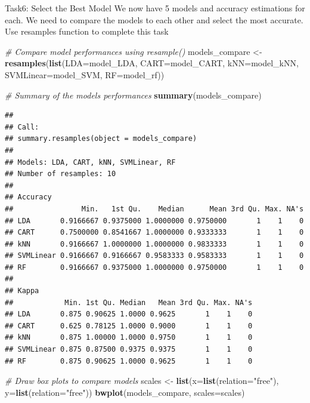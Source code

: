 \documentclass[
]{article}
\newenvironment{Shaded}{\begin{snugshade}}{\end{snugshade}}
\newcommand{\AttributeTok}[1]{\textcolor[rgb]{0.13,0.29,0.53}{#1}}
\newcommand{\CommentTok}[1]{\textcolor[rgb]{0.56,0.35,0.01}{\textit{#1}}}
\newcommand{\FunctionTok}[1]{\textcolor[rgb]{0.13,0.29,0.53}{\textbf{#1}}}
\newcommand{\NormalTok}[1]{#1}
\newcommand{\OtherTok}[1]{\textcolor[rgb]{0.56,0.35,0.01}{#1}}
\newcommand{\StringTok}[1]{\textcolor[rgb]{0.31,0.60,0.02}{#1}}
\begin{document}
Task6: Select the Best Model We now have 5 models and accuracy
estimations for each. We need to compare the models to each other and
select the most accurate. Use resamples function to complete this task

\begin{Shaded}
\begin{Highlighting}[]
\CommentTok{\# Compare model performances using resample()}
\NormalTok{models\_compare }\OtherTok{\textless{}{-}} \FunctionTok{resamples}\NormalTok{(}\FunctionTok{list}\NormalTok{(}\AttributeTok{LDA=}\NormalTok{model\_LDA, }\AttributeTok{CART=}\NormalTok{model\_CART, }\AttributeTok{kNN=}\NormalTok{model\_kNN, }\AttributeTok{SVMLinear=}\NormalTok{model\_SVM, }\AttributeTok{RF=}\NormalTok{model\_rf))}

\CommentTok{\# Summary of the models performances}
\FunctionTok{summary}\NormalTok{(models\_compare)}
\end{Highlighting}
\end{Shaded}

\begin{verbatim}
## 
## Call:
## summary.resamples(object = models_compare)
## 
## Models: LDA, CART, kNN, SVMLinear, RF 
## Number of resamples: 10 
## 
## Accuracy 
##                Min.   1st Qu.    Median      Mean 3rd Qu. Max. NA's
## LDA       0.9166667 0.9375000 1.0000000 0.9750000       1    1    0
## CART      0.7500000 0.8541667 1.0000000 0.9333333       1    1    0
## kNN       0.9166667 1.0000000 1.0000000 0.9833333       1    1    0
## SVMLinear 0.9166667 0.9166667 0.9583333 0.9583333       1    1    0
## RF        0.9166667 0.9375000 1.0000000 0.9750000       1    1    0
## 
## Kappa 
##            Min. 1st Qu. Median   Mean 3rd Qu. Max. NA's
## LDA       0.875 0.90625 1.0000 0.9625       1    1    0
## CART      0.625 0.78125 1.0000 0.9000       1    1    0
## kNN       0.875 1.00000 1.0000 0.9750       1    1    0
## SVMLinear 0.875 0.87500 0.9375 0.9375       1    1    0
## RF        0.875 0.90625 1.0000 0.9625       1    1    0
\end{verbatim}

\begin{Shaded}
\begin{Highlighting}[]
\CommentTok{\# Draw box plots to compare models}
\NormalTok{scales }\OtherTok{\textless{}{-}} \FunctionTok{list}\NormalTok{(}\AttributeTok{x=}\FunctionTok{list}\NormalTok{(}\AttributeTok{relation=}\StringTok{"free"}\NormalTok{), }\AttributeTok{y=}\FunctionTok{list}\NormalTok{(}\AttributeTok{relation=}\StringTok{"free"}\NormalTok{))}
\FunctionTok{bwplot}\NormalTok{(models\_compare, }\AttributeTok{scales=}\NormalTok{scales)}
\end{Highlighting}
\end{Shaded}
\end{document}

